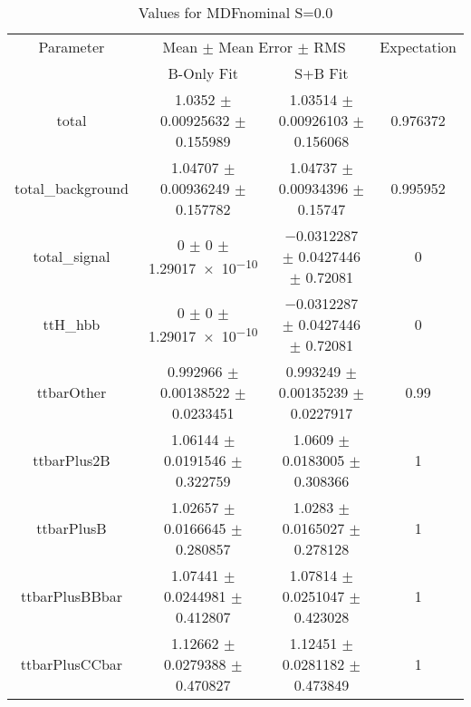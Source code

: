 \begin{table}
\centering
\caption{Values for MDFnominal S=0.0}
\begin{tabular}{cccc}
\toprule
Parameter & \multicolumn{2}{c}{Mean $\pm$ Mean Error $\pm$ RMS} & Expectation\\
 & B-Only Fit & S+B Fit & \\
\midrule
total & \num{1.0352} $\pm$ \num{0.00925632} $\pm$ \num{0.155989} & \num{1.03514} $\pm$ \num{0.00926103} $\pm$ \num{0.156068} & \num{0.976372}\\
total\_background & \num{1.04707} $\pm$ \num{0.00936249} $\pm$ \num{0.157782} & \num{1.04737} $\pm$ \num{0.00934396} $\pm$ \num{0.15747} & \num{0.995952}\\
total\_signal & \num{0} $\pm$ \num{0} $\pm$ \num{1.29017e-10} & \num{-0.0312287} $\pm$ \num{0.0427446} $\pm$ \num{0.72081} & \num{0}\\
ttH\_hbb & \num{0} $\pm$ \num{0} $\pm$ \num{1.29017e-10} & \num{-0.0312287} $\pm$ \num{0.0427446} $\pm$ \num{0.72081} & \num{0}\\
ttbarOther & \num{0.992966} $\pm$ \num{0.00138522} $\pm$ \num{0.0233451} & \num{0.993249} $\pm$ \num{0.00135239} $\pm$ \num{0.0227917} & \num{0.99}\\
ttbarPlus2B & \num{1.06144} $\pm$ \num{0.0191546} $\pm$ \num{0.322759} & \num{1.0609} $\pm$ \num{0.0183005} $\pm$ \num{0.308366} & \num{1}\\
ttbarPlusB & \num{1.02657} $\pm$ \num{0.0166645} $\pm$ \num{0.280857} & \num{1.0283} $\pm$ \num{0.0165027} $\pm$ \num{0.278128} & \num{1}\\
ttbarPlusBBbar & \num{1.07441} $\pm$ \num{0.0244981} $\pm$ \num{0.412807} & \num{1.07814} $\pm$ \num{0.0251047} $\pm$ \num{0.423028} & \num{1}\\
ttbarPlusCCbar & \num{1.12662} $\pm$ \num{0.0279388} $\pm$ \num{0.470827} & \num{1.12451} $\pm$ \num{0.0281182} $\pm$ \num{0.473849} & \num{1}\\
\bottomrule
\end{tabular}
\end{table}